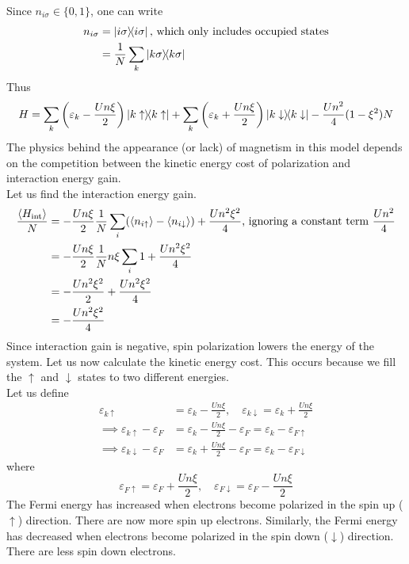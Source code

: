 \documentclass[12pt,a4paper,titlepage]{article}
\newcommand{\trm}[1]{\textrm{#1}} %
\newcommand{\up}{\uparrow} %
\newcommand{\dn}{\downarrow} %
\begin{document}
Since $n_{i\sigma}\in\{0,1\}$, one can write
\begin{equation}
\begin{aligned}
n_{i\sigma}&=\ketbra{i\sigma}{i\sigma}\trm{, which only includes occupied states}\\
&=\frac{1}{N}\sum_{k}\ketbra{k\sigma}{k\sigma}
\end{aligned}
\end{equation}
Thus
\begin{equation}
H=\sum_{k}\left(\varepsilon_{k}-\frac{Un\xi}{2}\right)\ketbra{k\up}{k\up}+\sum_{k}\left(\varepsilon_{k}+\frac{Un\xi}{2}\right)\ketbra{k\dn}{k\dn}-\frac{Un^{2}}{4}(1-\xi^{2})N
\end{equation}
The physics behind the appearance (or lack) of magnetism in this model depends on the competition between the kinetic energy cost of polarization and interaction energy gain.\\

Let us find the interaction energy gain.
\begin{equation}
\begin{aligned}
\frac{\expval{H_{\trm{int}}}}{N}&=-\frac{Un\xi}{2}\frac{1}{N}\sum_{i}(\expval{n_{i\up}}-\expval{n_{i\dn}})+\frac{Un^{2}\xi^{2}}{4}\trm{, ignoring a constant term $\frac{Un^{2}}{4}$}\\
&=-\frac{Un\xi}{2}\frac{1}{N}n\xi\sum_{i}1+\frac{Un^{2}\xi^{2}}{4}\\
&=-\frac{Un^{2}\xi^{2}}{2}+\frac{Un^{2}\xi^{2}}{4}\\
&=-\frac{Un^{2}\xi^{2}}{4}
\end{aligned}
\end{equation}
Since interaction gain is negative, spin polarization lowers the energy of the system. Let us now calculate the kinetic energy cost. This occurs because we fill the $\up$ and $\dn$ states to two different energies.\\

Let us define
\begin{equation}
\begin{aligned}
\varepsilon_{k\up}&=\varepsilon_{k}-\frac{Un\xi}{2},\quad\varepsilon_{k\dn}=\varepsilon_{k}+\frac{Un\xi}{2}\\
\implies\varepsilon_{k\up}-\varepsilon_{F}&=\varepsilon_{k}-\frac{Un\xi}{2}-\varepsilon_{F}=\varepsilon_{k}-\varepsilon_{F\up}\\
\implies\varepsilon_{k\dn}-\varepsilon_{F}&=\varepsilon_{k}+\frac{Un\xi}{2}-\varepsilon_{F}=\varepsilon_{k}-\varepsilon_{F\dn}
\end{aligned}
\end{equation}
where
\begin{equation}
\varepsilon_{F\up}=\varepsilon_{F}+\frac{Un\xi}{2},\quad\varepsilon_{F\dn}=\varepsilon_{F}-\frac{Un\xi}{2}
\end{equation}
The Fermi energy has increased when electrons become polarized in the spin up ($\up$) direction. There are now more spin up electrons. Similarly, the Fermi energy has decreased when electrons become polarized in the spin down ($\dn$) direction. There are less spin down electrons.
\end{document}
